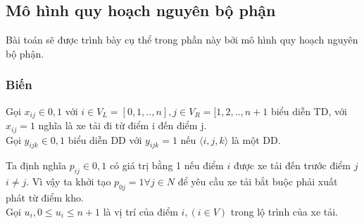 \documentclass[a4paper,12pt]{report}
\begin{document}
\subsection{Mô hình quy hoạch nguyên bộ phận}
Bài toán sẽ được trình bày cụ thể trong phần này bởi mô hình quy hoạch nguyên bộ phận.
\subsubsection{Biến}
Gọi $x_{ij} \in {0,1}$ với $i \in V_L= [0,1,..,n], j \in V_R= [1,2,..,n+1$ biểu diễn \ac{TD}, với $x_{ij}=1$ nghĩa là xe tải đi từ điểm i đến điểm j.\\

Gọi $y_{ijk} \in {0,1}$ biểu diễn \ac{DD} với $y_{ijk}=1$ nếu $\langle i,j,k \rangle$ là một \ac{DD}.

Ta định nghĩa $p_{ij} \in {0,1}$ có giá trị bằng 1 nếu điểm $i$ được xe tải đến trước điểm $j$ $i \neq j$. Vì vậy ta khởi tạo $p_{0j}=1 \forall j \in N$ để yêu cầu xe tải bắt buộc phải xuất phát từ điểm kho. \\

Gọi $u_i, 0\leq u_i \leq n+1$ là vị trí của điểm $i, (i \in V)$ trong lộ trình của xe tải.
\end{document}
